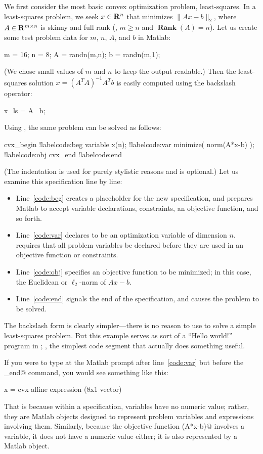 \documentclass[12pt]{article}
\def\Rank{\operatorname*{\textbf{Rank}}}
\begin{document}
We first consider the most basic convex optimization problem,
least-squares.
In a least-squares problem, we seek $x \in \R^n$
that minimizes $\|Ax-b\|_2$, where $A\in \R^{m \times n}$ is
skinny and full rank (\ie, $m\geq n$ and $\Rank (A)=n$).
Let us create some test problem data for $m$, $n$, $A$, and $b$ in Matlab:
\begin{code2}[firstnumber=17]
	m = 16; n = 8;
	A = randn(m,n);
	b = randn(m,1);
\end{code2}
(We chose small values of $m$ and $n$ to keep the output readable.)
Then the least-squares solution  $x=(A^TA)^{-1}A^Tb$ is easily
computed using the backslash operator: 
\begin{code2}[firstnumber=20]
	x_ls = A \ b;
\end{code2}
Using \cvx, the same problem can be solved as follows:
\begin{code2}[firstnumber=23]
	cvx_begin			!label{code:beg}
	    variable x(n);		!label{code:var}
	    minimize( norm(A*x-b) );	!label{code:obj}
	cvx_end				!label{code:end}
\end{code2}
(The indentation is used for purely stylistic reasons and is optional.) 
Let us examine this specification line by line:
\begin{itemize}
\item Line~\ref{code:beg} creates a placeholder for the
new \cvx specification, and prepares Matlab to accept 
variable declarations, constraints, an objective function, and so forth. 
\item Line~\ref{code:var} declares \verb@x@
to be an optimization variable of dimension $n$. \cvx
requires that all problem variables be declared before they are used in
an objective function or constraints. 
\item Line~\ref{code:obj}
specifies an objective function to be minimized; in this case,
the Euclidean or $\ell_2$-norm
of $Ax-b$. 
\item Line~\ref{code:end} signals the end of the \cvx specification,
and causes the problem to be solved.
\end{itemize}
The backslash form is clearly simpler---there is no reason to use \cvx
to solve a simple least-squares problem. But this
example serves as sort of a ``Hello world!'' program in \cvx;
\ie, the simplest code segment that actually does something useful.

If you were to type \verb@x@ at the
Matlab prompt after line~\ref{code:var} but
before the \verb@cvx_end@ command, you would see something
like this:
\begin{code}
	x =
	    cvx affine expression (8x1 vector)
\end{code}
That is because within a specification, variables have no
numeric value; rather, they are Matlab objects 
designed to represent problem variables and expressions
involving them. Similarly, 
because the objective function \verb@norm(A*x-b)@ 
involves a \cvx variable, it does not have a numeric value either; 
it is also represented by a Matlab object.
\end{document}
